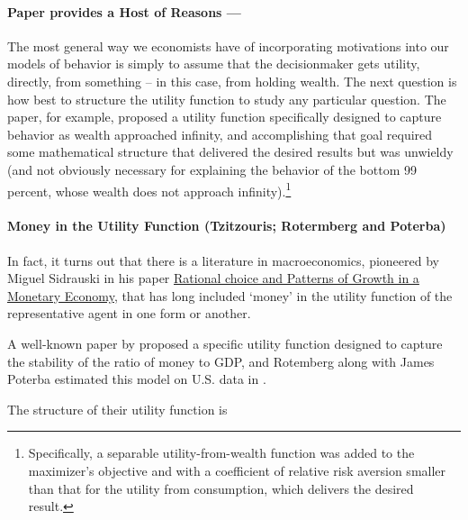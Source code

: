 \documentclass{article}
\begin{document}
\paragraph{Paper provides a Host of Reasons ---}


The most general way we economists have of incorporating motivations into our models of behavior is simply to assume that the decisionmaker gets utility, directly, from something -- in this case, from holding wealth. The next question is how best to structure the utility function to study any particular question. The \cite{Carroll1998d} paper, for example, proposed a utility function specifically designed to capture behavior as wealth approached infinity, and accomplishing that goal required some mathematical structure that delivered the desired results but was unwieldy (and not obviously necessary for explaining the behavior of the bottom 99 percent, whose wealth does not approach infinity).\footnote{Specifically, a separable utility-from-wealth function was added to the maximizer's objective and with a coefficient of relative risk aversion smaller than that for the utility from consumption, which delivers the desired result.}

\paragraph{Money in the Utility Function (Tzitzouris; Rotermberg and Poterba)}

In fact, it turns out that there is a literature in macroeconomics, pioneered by Miguel Sidrauski in his paper \href{}{Rational choice and Patterns of Growth in a Monetary Economy}, that has long included `money' in the utility function of the representative agent in one form or another.

A well-known paper by \cite{Rotemberg_1984} proposed a specific utility function designed to capture the stability of the ratio of money to GDP, and Rotemberg along with James Poterba estimated this model on U.S. data in \cite{Poterba_1986}.

The structure of their utility function is
\end{document}

